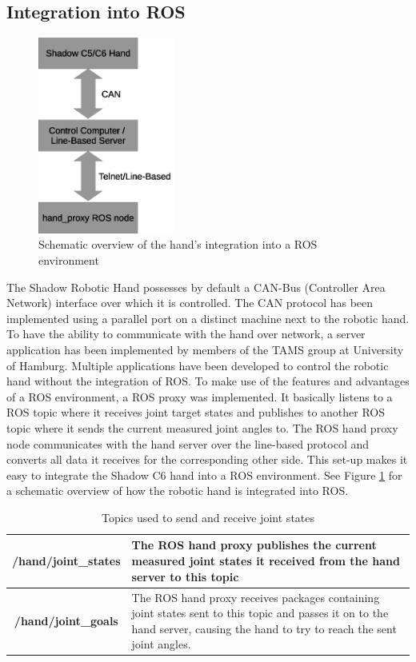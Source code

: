 \subsection{Integration into ROS}

\begin{figure}
	\caption{\label{fig:hand:ros_integration}Schematic overview of the hand's integration into a ROS environment}
	\includegraphics[width=0.4\textwidth]{assets/chpt_basics/hand/ros_integration.eps}
\end{figure}

The Shadow Robotic Hand possesses by default a CAN-Bus (Controller Area Network) interface over which it is controlled\cite{web:robothand:spec}. The CAN protocol has been implemented using a parallel port on a distinct machine next to the robotic hand. To have the ability to communicate with the hand over network, a server application has been implemented by members of the TAMS group at University of Hamburg. 
Multiple applications have been developed to control the robotic hand without the integration of ROS. To make use of the features and advantages of a ROS environment, a ROS proxy was implemented. It basically listens to a ROS topic where it receives joint target states and publishes to another ROS topic where it sends the current measured joint angles to. The ROS hand proxy node communicates with the hand server over the line-based protocol and converts all data it receives for the corresponding other side. This set-up makes it easy to integrate the Shadow C6 hand into a ROS environment. See Figure \ref{fig:hand:ros_integration} for a schematic overview of how the robotic hand is integrated into ROS.

\begin{table}
	\caption{\label{tab:rosmsg:topics}Topics used to send and receive joint states}
	\begin{tabularx}{\linewidth}{|c|X|}
		\hline
		\textbf{/hand/joint\_states} & The ROS hand proxy publishes the current measured joint states it received from the hand server to this topic \\
		\hline
		\textbf{/hand/joint\_goals} & The ROS hand proxy receives packages containing joint states sent to this topic and passes it on to the hand server, causing the hand to try to reach the sent joint angles. \\
		\hline
	\end{tabularx}
\end{table}

